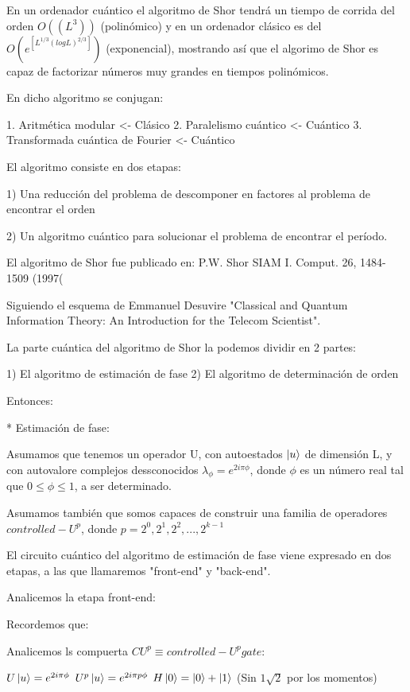 En un ordenador cuántico el algoritmo de Shor tendrá un tiempo de corrida del orden $O((L^3))$ (polinómico) y en un ordenador clásico es del $O(e^[L^{1/3} (log L)^{2/3}])$ (exponencial), mostrando así que el algorimo de Shor es capaz de factorizar números muy grandes en tiempos polinómicos.

En dicho algoritmo se conjugan:

1. Aritmética modular <- Clásico
2. Paralelismo cuántico <- Cuántico
3. Transformada cuántica de Fourier <- Cuántico

El algoritmo consiste en dos etapas:

1) Una reducción del problema de descomponer en factores al problema de encontrar el orden

2) Un algoritmo cuántico para solucionar el problema de encontrar el período.

El algoritmo de Shor fue publicado en: P.W. Shor SIAM I. Comput. 26, 1484-1509 (1997(

Siguiendo el esquema de Emmanuel Desuvire "Classical and Quantum Information Theory: An Introduction for the Telecom Scientist".

La parte cuántica del algoritmo de Shor la podemos dividir en 2 partes:

1) El algoritmo de estimación de fase
2) El algoritmo de determinación de orden

Entonces:

* Estimación de fase:

Asumamos que tenemos un operador U, con autoestados $\ket{u}$ de dimensión L, y con autovalore complejos dessconocidos $\lambda_\phi = e^{2 i \pi \phi}$, donde $\phi$ es un número real tal que $0 \leq \phi \leq 1$, a ser determinado.

Asumamos también que somos capaces de construir una familia de operadores $controlled-U^p$, donde $p = 2^0, 2^1, 2^2, ..., 2^{k-1}$

El circuito cuántico del algoritmo de estimación de fase viene expresado en dos etapas, a las que llamaremos "front-end" y "back-end".

Analicemos la etapa front-end:


Recordemos que:


Analicemos ls compuerta $CU^p \equiv controlled-U^p gate$:


$U \ket{u} = e^{2 i \pi \phi}$
$U^p \ket{u} = e^{2 i \pi p \phi}$
$H \ket{0} = \ket{0} + \ket{1}$ (Sin $1\sqrt{2}$ por los momentos)

